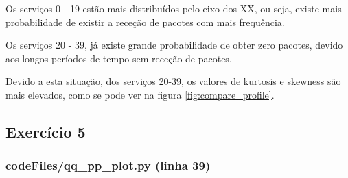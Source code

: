 \documentclass[pdftex,12pt,a4paper]{report}
\begin{document}
Os serviços 0 - 19 estão mais distribuídos pelo eixo dos XX, ou seja, existe mais probabilidade de existir a receção de pacotes com mais frequência.

Os serviços 20 - 39, já existe grande probabilidade de obter zero pacotes, devido aos longos períodos de tempo sem receção de pacotes. 

Devido a esta situação, dos serviços 20-39, os valores de kurtosis e skewness são mais elevados, como se pode ver na figura \ref{fig:compare_profile}.

\newpage
\subsection{Exercício 5}
\subsubsection{codeFiles/qq\_pp\_plot.py (linha 39)}
\end{document}
